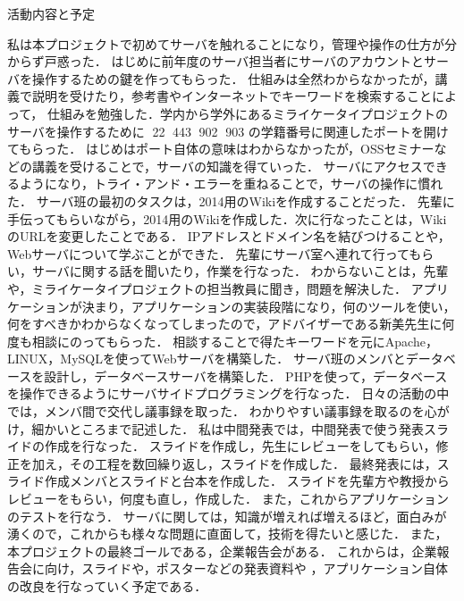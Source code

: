 \par
活動内容と予定
\par
私は本プロジェクトで初めてサーバを触れることになり，管理や操作の仕方が分からず戸惑った．
はじめに前年度のサーバ担当者にサーバのアカウントとサーバを操作するための鍵を作ってもらった．
仕組みは全然わからなかったが，講義で説明を受けたり，参考書やインターネットでキーワードを検索することによって，
仕組みを勉強した．学内から学外にあるミライケータイプロジェクトのサーバを操作するために
22
443
902
903
の学籍番号に関連したポートを開けてもらった．
はじめはポート自体の意味はわからなかったが，OSSセミナーなどの講義を受けることで，サーバの知識を得ていった．
サーバにアクセスできるようになり，トライ・アンド・エラーを重ねることで，サーバの操作に慣れた．
サーバ班の最初のタスクは，2014用のWikiを作成することだった．
先輩に手伝ってもらいながら，2014用のWikiを作成した．次に行なったことは，WikiのURLを変更したことである．
IPアドレスとドメイン名を結びつけることや，Webサーバについて学ぶことができた．
先輩にサーバ室へ連れて行ってもらい，サーバに関する話を聞いたり，作業を行なった．
わからないことは，先輩や，ミライケータイプロジェクトの担当教員に聞き，問題を解決した．
アプリケーションが決まり，アプリケーションの実装段階になり，何のツールを使い，
何をすべきかわからなくなってしまったので，アドバイザーである新美先生に何度も相談にのってもらった．
相談することで得たキーワードを元にApache，LINUX，MySQLを使ってWebサーバを構築した．
サーバ班のメンバとデータベースを設計し，データベースサーバを構築した．
PHPを使って，データベースを操作できるようにサーバサイドプログラミングを行なった．
日々の活動の中では，メンバ間で交代し議事録を取った．
わかりやすい議事録を取るのを心がけ，細かいところまで記述した．
私は中間発表では，中間発表で使う発表スライドの作成を行なった．
スライドを作成し，先生にレビューをしてもらい，修正を加え，その工程を数回繰り返し，スライドを作成した．
最終発表には，スライド作成メンバとスライドと台本を作成した．
スライドを先輩方や教授からレビューをもらい，何度も直し，作成した．
また，これからアプリケーションのテストを行なう．
サーバに関しては，知識が増えれば増えるほど，面白みが湧くので，これからも様々な問題に直面して，技術を得たいと感じた．
また，本プロジェクトの最終ゴールである，企業報告会がある．
これからは，企業報告会に向け，スライドや，ポスターなどの発表資料や
，アプリケーション自体の改良を行なっていく予定である．
